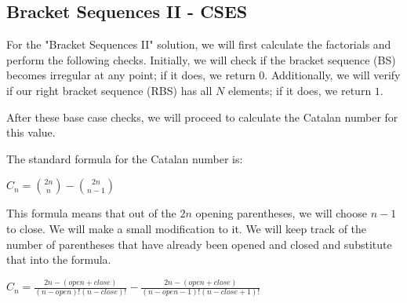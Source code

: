         \subsection{Bracket Sequences II - CSES}
            For the "Bracket Sequences II" solution, we will first calculate the factorials and perform the following checks. Initially, we will check if the bracket sequence (BS) becomes irregular at any point; if it does, we return $0$. Additionally, we will verify if our right bracket sequence (RBS) has all $N$ elements; if it does, we return $1$.

            After these base case checks, we will proceed to calculate the Catalan number for this value.
 
            The standard formula for the Catalan number is:

            $C_n = \binom{2n}{n} - \binom{2n}{n - 1}$

            This formula means that out of the $2n$ opening parentheses, we will choose $n - 1$ to close. We will make a small modification to it. We will keep track of the number of parentheses that have already been opened and closed and substitute that into the formula. 

            $C_n = \frac{2n - (open + close)}{(n-open)!(n-close)!} - \frac{2n - (open + close)}{(n-open-1)!(n-close+1)!}$
